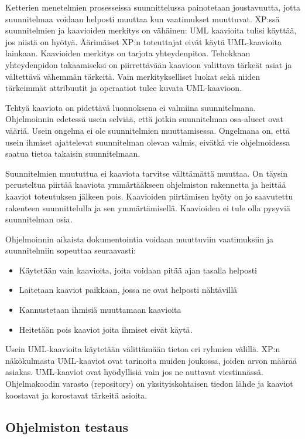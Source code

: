 \documentclass[finnish]{tktltiki2}
\theoremstyle{definition}
\theoremstyle{remark}
\begin{document}
Ketterien menetelmien prosesseissa suunnittelussa painotetaan joustavuutta, jotta suunnitelmaa voidaan helposti muuttaa kun vaatimukset muuttuvat. XP:ssä suunnitelmien ja kaavioiden merkitys on vähäinen: UML kaavioita tulisi käyttää, jos niistä on hyötyä. Äärimäiset XP:n toteuttajat eivät käytä UML-kaavioita lainkaan\cite{FOW01b}. Kaavioiden merkitys on tarjota yhteydenpitoa. Tehokkaan yhteydenpidon takaamiseksi on piirrettävään kaavioon valittava tärkeät asiat ja vältettävä vähemmän tärkeitä. Vain merkitykselliset luokat sekä niiden tärkeimmät attribuutit ja operaatiot tulee kuvata UML-kaavioon\cite{FOW01b}.

Tehtyä kaaviota on pidettävä luonnoksena ei valmiina suunnitelmana. Ohjelmoinnin edetessä usein selviää, että jotkin suunnitelman osa-alueet ovat vääriä. Usein ongelma ei ole suunnitelmien muuttamisessa. Ongelmana on, että usein ihmiset ajattelevat suunnitelman olevan valmis, eivätkä vie ohjelmoidessa saatua tietoa takaisin suunnitelmaan\cite{FOW01b}. 

Suunnitelmien muututtua ei kaaviota tarvitse välttämättä muuttaa. On täysin perusteltua piirtää kaaviota ymmärtääkseen ohjelmiston rakennetta ja heittää kaaviot toteutuksen jälkeen pois. Kaavioiden piirtämisen hyöty on jo saavutettu rakenteen suunnittelulla ja sen ymmärtämisellä. Kaavioiden ei tule olla pysyviä suunnitelman osia\cite{FOW01b}.

Ohjelmoinnin aikaista dokumentointia voidaan muuttuviin vaatimuksiin ja suunnitelmiin sopeuttaa seuraavasti:

\begin{itemize}
 \item Käytetään vain kaavioita, joita voidaan pitää ajan tasalla helposti 
 \item Laitetaan kaaviot paikkaan, jossa ne ovat helposti nähtävillä
 \item Kannustetaan ihmisiä muuttamaan kaavioita
 \item Heitetään pois kaaviot joita ihmiset eivät käytä\cite{FOW01b}.
\end{itemize}

Usein UML-kaavioita käytetään välittämään tietoa eri ryhmien välillä. XP:n näkökulmasta UML-kaaviot ovat tarinoita muiden joukossa, joiden arvon määrää asiakas. UML-kaaviot ovat hyödyllisiä vain jos ne auttavat viestinnässä. Ohjelmakoodin varasto (repository) on yksityiskohtaisen tiedon lähde ja kaaviot koostavat ja korostavat tärkeitä asioita\cite{FOW01b}.    


\subsection{Ohjelmiston testaus}
\end{document}
